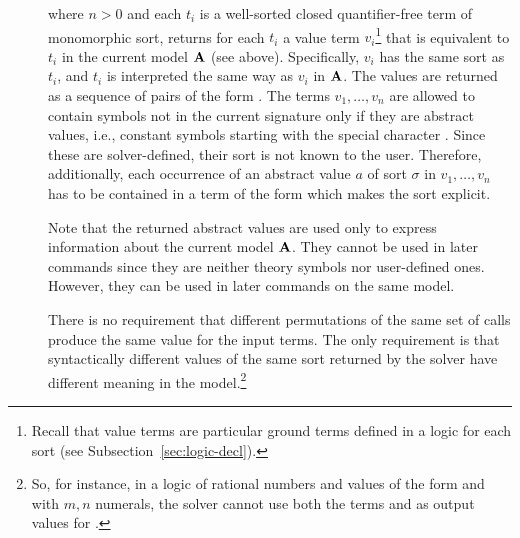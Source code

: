 \begin{description}

%
\item[]
where $n > 0$ and each $t_i$ is a well-sorted closed quantifier-free term
of monomorphic sort, 
returns for each $t_i$ a value term $v_i$\footnote{%
Recall that value terms are particular ground terms defined in a logic 
for each sort (see Subsection~\ref{sec:logic-decl}).  
} 
that is equivalent to $t_i$ in the current model $\mathbf{A}$ (see above).
Specifically, $v_i$ has the same sort as $t_i$, and 
$t_i$ is interpreted the same way as $v_i$ in $\mathbf{A}$.
The values are returned as a sequence of pairs of the form 
.
The terms $v_1,\ldots,v_n$  are allowed to contain symbols
not in the current signature only if they are abstract values, 
i.e., constant symbols starting with the special character .
Since these are solver-defined, their sort is not known to the user.
Therefore, additionally, each occurrence of an abstract value 
$a$ of sort $\sigma$ in $v_1,\ldots,v_n$ has to be contained in a term 
of the form  which makes the sort explicit.

Note that the returned abstract values are used only to express 
information about the current model $\mathbf{A}$.
They cannot be used in later  commands 
since they are neither theory symbols nor user-defined ones.
However, they can be used in later  commands 
on the same model.

There is no requirement that different permutations 
of the same set of  calls produce the same value 
for the input terms.
The only requirement is that syntactically different values 
of the same sort returned by the solver have different meaning 
in the model.\footnote{%
So, for instance, in a logic of rational numbers and values of the form
 and  with $m,n$ numerals, 
the solver cannot use both the terms  and 
as output values for .
}


\end{description}

